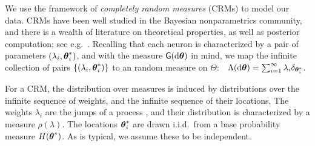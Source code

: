% 
% 
We use the framework of \emph{completely random measures} (CRMs) \citep{Kingman:PJM67} to model our data.
CRMs have been well studied in the Bayesian nonparametrics community, and there is a wealth of literature on
theoretical properties, as well as posterior computation; see e.g.\ \citep{JamesLP09, Hjo1990, ThiJor2007}. 
Recalling that each neuron is characterized by a pair of parameters $(\lambda_i, \boldsymbol{\theta}^*_i)$, and with the measure $\mathsf{G}(\mathrm{d} \boldsymbol{\theta})$ in mind,
we map the infinite collection of pairs $\{(\lambda_i, \boldsymbol{\theta}^*_i)\}$ to an random measure on $\Theta$:
$\ \  \Lambda(\mathrm{d} \boldsymbol{\theta}) = \sum_{i=1}^{\infty} \lambda_i \delta_{\boldsymbol{\theta}^*_i}$.

For a CRM, the distribution over measures is induced by distributions
over the infinite sequence of weights, and the infinite sequence of their locations. 
The weights $\lambda_i$ are the jumps of a \Levy process \citep{Sato90}, and their distribution is characterized by a 
\Levy measure $\rho(\lambda)$. The locations $\boldsymbol{\theta}^*_i$ are drawn i.i.d.\  from a base probability measure $H(\boldsymbol{\theta}^*)$.
As is typical, we assume these to be independent. %


